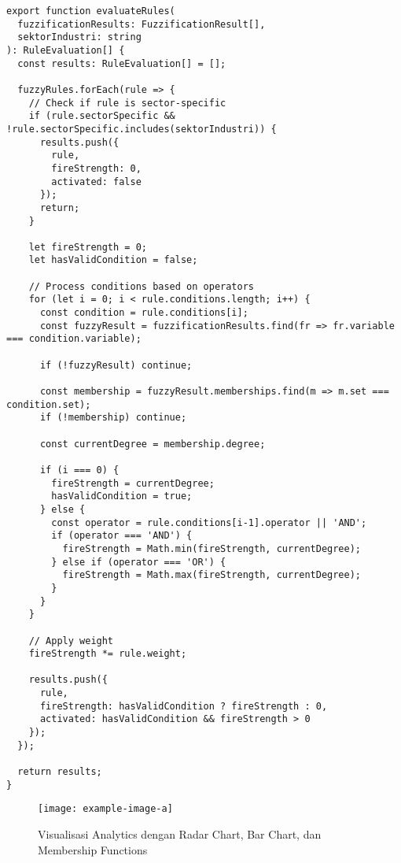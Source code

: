 \documentclass[12pt,a4paper]{article}
\begin{document}
\begin{verbatim}
export function evaluateRules(
  fuzzificationResults: FuzzificationResult[], 
  sektorIndustri: string
): RuleEvaluation[] {
  const results: RuleEvaluation[] = [];
  
  fuzzyRules.forEach(rule => {
    // Check if rule is sector-specific
    if (rule.sectorSpecific && !rule.sectorSpecific.includes(sektorIndustri)) {
      results.push({
        rule,
        fireStrength: 0,
        activated: false
      });
      return;
    }
    
    let fireStrength = 0;
    let hasValidCondition = false;
    
    // Process conditions based on operators
    for (let i = 0; i < rule.conditions.length; i++) {
      const condition = rule.conditions[i];
      const fuzzyResult = fuzzificationResults.find(fr => fr.variable === condition.variable);
      
      if (!fuzzyResult) continue;
      
      const membership = fuzzyResult.memberships.find(m => m.set === condition.set);
      if (!membership) continue;
      
      const currentDegree = membership.degree;
      
      if (i === 0) {
        fireStrength = currentDegree;
        hasValidCondition = true;
      } else {
        const operator = rule.conditions[i-1].operator || 'AND';
        if (operator === 'AND') {
          fireStrength = Math.min(fireStrength, currentDegree);
        } else if (operator === 'OR') {
          fireStrength = Math.max(fireStrength, currentDegree);
        }
      }
    }
    
    // Apply weight
    fireStrength *= rule.weight;
    
    results.push({
      rule,
      fireStrength: hasValidCondition ? fireStrength : 0,
      activated: hasValidCondition && fireStrength > 0
    });
  });
  
  return results;
}
\end{verbatim}

\begin{figure}[htbp] %
    \centering
    \texttt{[image: example-image-a]} %
    \caption{Visualisasi Analytics dengan Radar Chart, Bar Chart, dan Membership Functions}
    \label{fig:analytics}
\end{figure}
\end{document}
